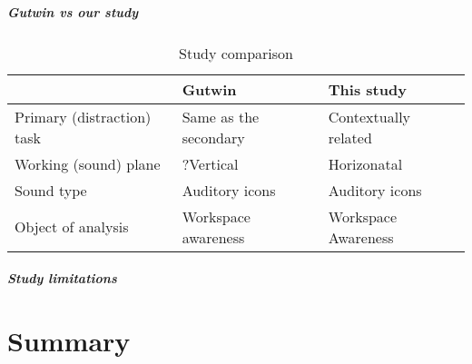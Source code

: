 \paragraph{Gutwin vs our study}

\begin{table}[]
  \caption{Study comparison}
  \label{table:study_comp}
  \begin{tabular}{|l|l|l|}
  \hline
                             & Gutwin                & This study           \\ \hline
  Primary (distraction) task & Same as the secondary & Contextually related \\ \hline
  Working (sound) plane      & ?Vertical             & Horizonatal          \\ \hline
  Sound type                 & Auditory icons        & Auditory icons       \\ \hline
  Object of analysis         & Workspace awareness   & Workspace Awareness  \\ \hline
  \end{tabular}
\end{table}

\paragraph{Study limitations}

\chapter{Summary}



\begin{comment}
Methodology: approach to solving the problem; chosen HCI methodology for the final evaluation - no idea
a. Chosen HCI evaluation methodology
\end{comment}



